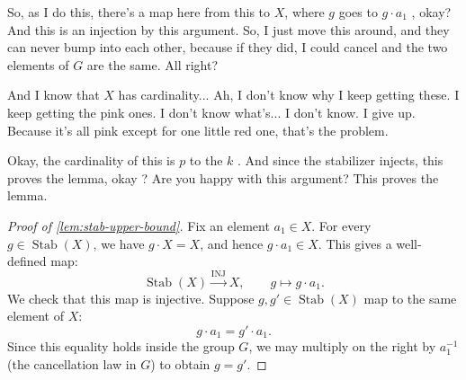 \begin{proofWrapper}
\begin{content}
\begin{center}
\end{center}
\end{content}

\begin{speech}[00:10:03 - 00:11:18]
So, as I do this, there's a map here from this to $X$, where $g$ goes to $g \cdot a_1$ , okay? And this is an injection  by this argument. So, I just move this around, and they can never bump into each other, because if they did, I could cancel and the two elements of $G$ are the same. All right?

And I know that $X$ has cardinality... Ah, I don't know why I keep getting these. I keep getting the pink ones. I don't know what's... I don't know. I give up. Because it's all pink except for one little red one, that's the problem.

Okay, the cardinality of this is $p$ to the $k$ . And since the stabilizer injects, this proves the lemma, okay ? Are you happy with this argument? This proves the lemma.
\end{speech}

\begin{content}
\begin{proof}[Proof of \cref{lem:stab-upper-bound}]
Fix an element $a_1 \in X$. For every $g \in \operatorname{Stab}(X)$, we have $g \cdot X = X$, and hence $g \cdot a_1 \in X$. This gives a well-defined map:
\[
\operatorname{Stab}(X) \xrightarrow{\text{INJ}} X, \qquad g \mapsto g \cdot a_1.
\]
We check that this map is injective. Suppose $g, g' \in \operatorname{Stab}(X)$ map to the same element of $X$:
\[
g \cdot a_1 = g' \cdot a_1.
\]
Since this equality holds inside the group $G$, we may multiply on the right by $a_1^{-1}$ (the cancellation law in $G$) to obtain $g = g'$.


\end{proof}
\end{content}
\end{proofWrapper}
